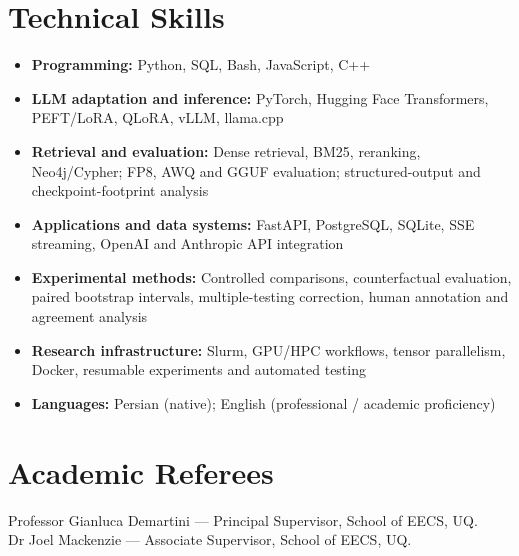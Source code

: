 \documentclass[11pt, a4paper]{article}
\begin{document}
\section{Technical Skills}
\begin{itemize}
  \item \textbf{Programming:} Python, SQL, Bash, JavaScript, C++
  \item \textbf{LLM adaptation and inference:} PyTorch, Hugging Face Transformers, PEFT/LoRA, QLoRA, vLLM, llama.cpp
  \item \textbf{Retrieval and evaluation:} Dense retrieval, BM25, reranking, Neo4j/Cypher; FP8, AWQ and GGUF evaluation; structured-output and checkpoint-footprint analysis
  \item \textbf{Applications and data systems:} FastAPI, PostgreSQL, SQLite, SSE streaming, OpenAI and Anthropic API integration
  \item \textbf{Experimental methods:} Controlled comparisons, counterfactual evaluation, paired bootstrap intervals, multiple-testing correction, human annotation and agreement analysis
  \item \textbf{Research infrastructure:} Slurm, GPU/HPC workflows, tensor parallelism, Docker, resumable experiments and automated testing
  \item \textbf{Languages:} Persian (native); English (professional / academic proficiency)
\end{itemize}

\section{Academic Referees}
Professor Gianluca Demartini --- Principal Supervisor, School of EECS, UQ.\\
Dr Joel Mackenzie --- Associate Supervisor, School of EECS, UQ.
\end{document}
